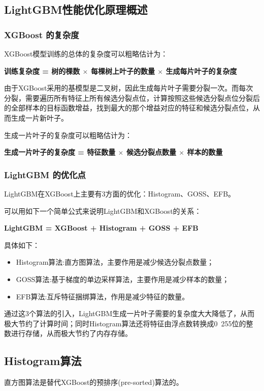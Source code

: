 \documentclass[12pt]{article}
\begin{document}
\subsection{LightGBM性能优化原理概述}
\subsubsection{XGBoost 的复杂度}
XGBoost模型训练的总体的复杂度可以粗略估计为：

\textbf{训练复杂度 = 树的棵数 $\times$ 每棵树上叶子的数量 $\times$ 生成每片叶子的复杂度}

由于XGBoost采用的基模型是二叉树，因此生成每片叶子需要分裂一次。而每次分裂，需要遍历所有特征上所有候选分裂点位，计算按照这些候选分裂点位分裂后的全部样本的目标函数增益，找到最大的那个增益对应的特征和候选分裂点位，从而生成一片新叶子。

生成一片叶子的复杂度可以粗略估计为：

\textbf{生成一片叶子的复杂度 = 特征数量 $\times$ 候选分裂点数量 $\times$ 样本的数量}

\subsubsection{LightGBM 的优化点}
LightGBM在XGBoost上主要有3方面的优化：Histogram、GOSS、EFB。

可以用如下一个简单公式来说明LightGBM和XGBoost的关系：

\textbf{LightGBM = XGBoost + Histogram + GOSS + EFB}

具体如下：
\begin{itemize}
\setlength{\itemsep}{0pt}
\setlength{\parsep}{0pt}
\setlength{\parskip}{0pt}
    \item Histogram算法:直方图算法，主要作用是减少候选分裂点数量；
    \item GOSS算法:基于梯度的单边采样算法，主要作用是减少样本的数量；
    \item EFB算法:互斥特征捆绑算法，作用是减少特征的数量。
\end{itemize}

通过这3个算法的引入，LightGBM生成一片叶子需要的复杂度大大降低了，从而极大节约了计算时间；同时Histogram算法还将特征由浮点数转换成0~255位的整数进行存储，从而极大节约了内存存储。

\subsection{Histogram算法}
直方图算法是替代XGBoost的预排序(pre-sorted)算法的。
\end{document}
